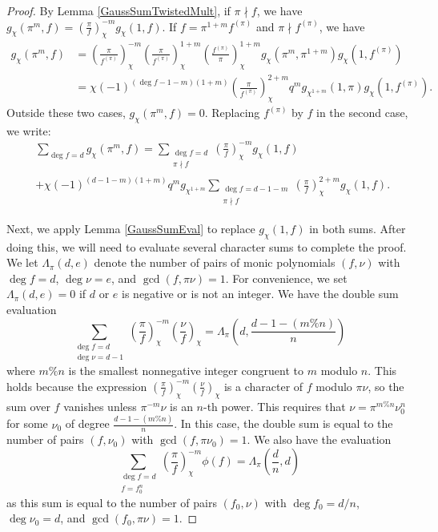 \documentclass[11pt,letterpaper]{article}
\theoremstyle{definition}
\theoremstyle{remark}
\numberwithin{equation}{section}
\theoremstyle{dotless}
\newcommand{\res}[2]{\left(\frac{#1}{#2}\right)}
\begin{document}
\begin{proof}
By Lemma \ref{GaussSumTwistedMult}, if $\pi \nmid f$,  we have $g_{\chi}(\pi^{m}, f) = \res{\pi}{f}_{\chi}^{-m} g_{\chi}(1, f)$. If $f=\pi^{1+m}f^{(\pi)}$ and $\pi \nmid f^{(\pi)}$, we have
\begin{equation*}
\begin{split}
g_{\chi}(\pi^{m}, f) &=\res{\pi}{f^{(\pi)}}_{\chi}^{-m} \res{\pi}{f^{(\pi)}}_{\chi}^{1+m}\res{f^{(\pi)}}{\pi}_{\chi}^{1+m}g_{\chi}(\pi^{m}, \pi^{1+m})g_{\chi}(1, f^{(\pi)}) \\
&=\chi(-1)^{(\deg f-1-m)(1+m)} \res{\pi}{f^{(\pi)}}_{\chi}^{2+m} q^{m} g_{\chi^{1+m}}(1, \pi)g_{\chi}(1, f^{(\pi)}).
\end{split}
\end{equation*}
Outside these two cases, $g_{\chi}(\pi^{m}, f)=0$. Replacing $f^{(\pi)}$ by $f$ in the second case, we write:
\begin{equation} \label{GSSParts}
\begin{split}
&\sum_{\deg f = d} g_{\chi}(\pi^{m}, f) = \sum_{\substack{\deg f = d \\ \pi \nmid f}} \res{\pi}{f}_{\chi}^{-m} g_{\chi}(1, f) \\
&+\chi(-1)^{(d-1-m)(1+m)} q^{m} g_{\chi^{1+m}} \sum_{\substack{\deg f = d-1-m \\ \pi \nmid f}} \res{\pi}{f}_{\chi}^{2+m}  g_{\chi}(1, f).
\end{split}
\end{equation}

Next, we apply Lemma \ref{GaussSumEval} to replace $g_{\chi}(1,f)$ in both sums. After doing this, we will need to evaluate several character sums to complete the proof. We let $\Lambda_{\pi}(d,e)$ denote the number of pairs of monic polynomials $(f, \nu)$ with $\deg f = d$, $\deg \nu =e$, and $\gcd(f, \pi\nu)=1$. For convenience, we set $\Lambda_{\pi}(d,e)=0$ if $d$ or $e$ is negative or is not an integer. We have the double sum evaluation
\begin{equation*}
\sum_{\substack{\deg f = d \\ \deg \nu = d-1}} \res{\pi}{f}_{\chi}^{-m} \res{\nu}{f}_{\chi} = \Lambda_{\pi}\left(d, \frac{d-1- (m \% n)}{n}\right)
\end{equation*}
where $m \% n$ is the smallest nonnegative integer congruent to $m$ modulo $n$. 
This holds because the expression $\res{\pi}{f}_{\chi}^{-m} \res{\nu}{f}_{\chi}$ is a character of $f$ modulo $\pi \nu$, so the sum over $f$ vanishes unless $\pi^{-m} \nu$ is an $n$-th power. This requires that $\nu = \pi^{m \%  n} \nu_0^n$ for some $\nu_0$ of degree $\frac{d-1- (m \% n)}{n}$. In this case, the double sum is equal to the number of pairs $(f, \nu_0)$ with $\gcd(f, \pi \nu_0)=1$. We also have the evaluation 
\begin{equation*}
\sum_{\substack{\deg f = d \\ f=f_0^n}} \res{\pi}{f}_{\chi}^{-m} \phi(f)  = \Lambda_{\pi}\left(\frac{d}{n}, d\right)
\end{equation*}
as this sum is equal to the number of pairs $(f_0, \nu)$ with $\deg f_0 = d/n$, $\deg \nu_0=d$, and $\gcd(f_0, \pi \nu)=1$.


\end{proof}
\end{document}
